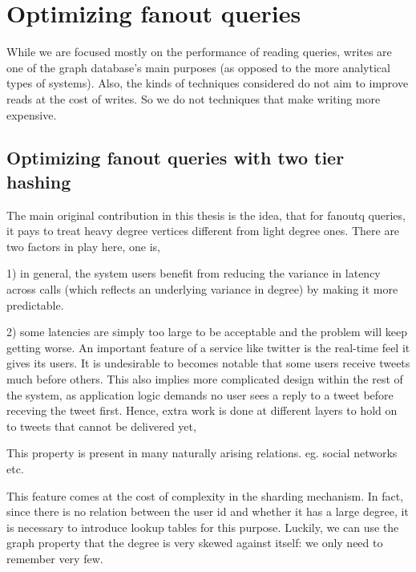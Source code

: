 \chapter{Optimizing fanout queries}

While we are focused mostly on the performance of reading queries, writes are one of the graph database's main purposes (as opposed to the more analytical types of systems).  Also, the kinds of techniques considered do not aim to improve reads at the cost of writes. So we do not  techniques that make writing more expensive.

\section{Optimizing fanout queries with two tier hashing}
\label{section:optfanout}
The main original contribution in this thesis is the idea, that for fanoutq queries, it pays to treat heavy degree vertices different from light degree ones.  There are two factors in play here, one is,  

1) in general, the system users benefit from reducing the variance in latency across calls (which reflects an underlying variance in degree) by making it more predictable. 


2) some latencies are simply too large to be acceptable %
and the problem will keep getting worse.  An important feature of a service like twitter is the real-time feel it gives its users. It is undesirable to  becomes notable that some users receive tweets much before others. This also implies more complicated design within the rest of the system, as application logic demands no user sees a reply to a tweet before receving the tweet first.  Hence, extra work is done at different layers to hold on to tweets that cannot be delivered yet, 

This property is present in many naturally arising relations. eg. social networks etc.

This feature comes at the cost of complexity in the sharding mechanism. In fact, since there is no relation between the user id and whether it has a large degree, it is necessary to introduce lookup tables for this purpose. Luckily, we can use the graph property that  the degree is very skewed against itself: we only need to remember very few. 


